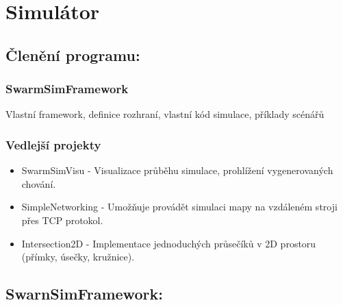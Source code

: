 
\chapter{Simulátor}
\section{Členění programu:}
\subsection{SwarmSimFramework} 
Vlastní framework, definice rozhraní, vlastní kód simulace, příklady scénářů
\subsection{Vedlejší projekty}
\begin{itemize}
\item SwarmSimVisu - 
Visualizace průběhu simulace, prohlížení vygenerovaných chování. 
\item SimpleNetworking -
Umožňuje provádět simulaci mapy na vzdáleném stroji přes TCP protokol.
\item Intersection2D - 
Implementace jednoduchých průsečíků v 2D prostoru (přímky, úsečky, kružnice).
\end{itemize}
\newpage
\section{SwarnSimFramework:}
